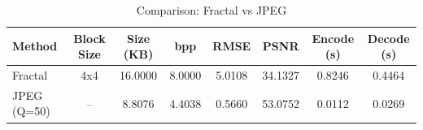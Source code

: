 \begin{table}[h]
\caption{Comparison: Fractal vs JPEG}
\label{tab:compression}
\begin{tabular}{lccccccc}
\toprule
Method & Block Size & Size (KB) & bpp & RMSE & PSNR & Encode (s) & Decode (s) \\
\midrule
Fractal & 4x4 & 16.0000 & 8.0000 & 5.0108 & 34.1327 & 0.8246 & 0.4464 \\
JPEG (Q=50) & -- & 8.8076 & 4.4038 & 0.5660 & 53.0752 & 0.0112 & 0.0269 \\
\bottomrule
\end{tabular}
\end{table}
